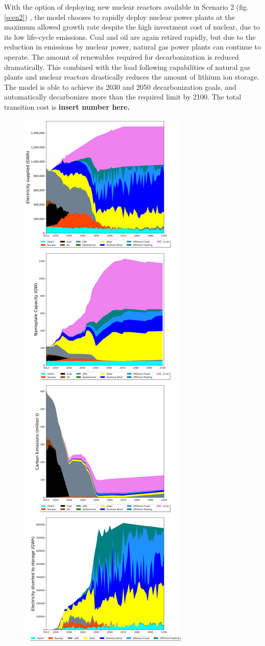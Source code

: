 With the option of deploying new nuclear reactors available in Scenario 2 (fig. \ref{scen2}) , the model chooses to rapidly deploy nuclear power plants at the maximum allowed growth rate despite the high investment cost of nuclear, due to its low life-cycle emissions. Coal and oil are again retired rapidly, but due to the reduction in emissions by nuclear power, natural gas power plants can continue to operate. The amount of renewables required for decarbonization is reduced dramatically. This combined with the load following capabilities of natural gas plants and nuclear reactors drastically reduces the amount of lithium ion storage. The model is able to achieve its 2030 and 2050 decarbonization goals, and automatically decarbonizes more than the required limit by 2100. The total transition cost is \textbf{insert number here.}
\begin{figure}[h] 
\centering
\label{scen1}
\includegraphics[scale=0.25]{figures/conv_nonuc}

\end{figure}
